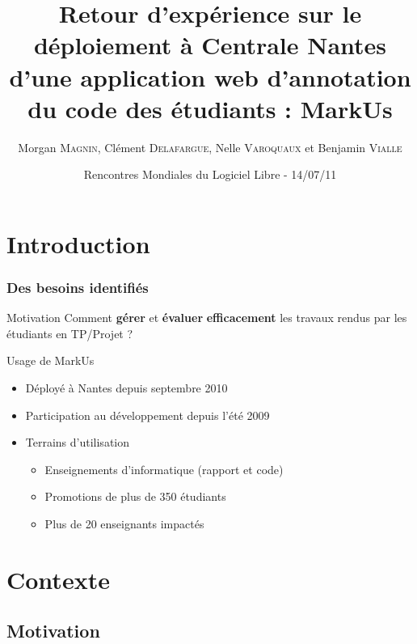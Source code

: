 \documentclass[hyperref,french,usenames,xcolor=dvipsnames]{beamer}
\title[REX MarkUs]%
{Retour d’expérience sur le déploiement à Centrale Nantes d’une application web d’annotation du code des étudiants : MarkUs}
\author[M. \textsc{Magnin}, G. \textsc{Moreau}, N. \textsc{Varoquaux}, B. \textsc{Vialle}]%
{Morgan \textsc{Magnin}, Clément \textsc{Delafargue}, Nelle \textsc{Varoquaux} et Benjamin \textsc{Vialle}
}
\institute[ECN]{
\structure{
École Centrale de Nantes}
}
\date[14/07/2011]{Rencontres Mondiales du Logiciel Libre - 14/07/11}
\begin{document}
\frame{\titlepage}


\section{Introduction}

\frame
{
  \frametitle{Des besoins identifiés}

\begin{alertblock}{Motivation}
Comment \textbf{gérer} et \textbf{évaluer} \textbf{efficacement} les travaux rendus par les étudiants en TP/Projet ?
\end{alertblock}

\begin{block}{Usage de MarkUs}
\begin{itemize}
\item Déployé à Nantes depuis septembre 2010
\item Participation au développement depuis l'été 2009
\item Terrains d'utilisation
\begin{itemize}
\item Enseignements d'informatique (rapport et code)
\item Promotions de plus de 350 étudiants
\item Plus de 20 enseignants impactés
\end{itemize}
\end{itemize}
\end{block}
}

\section{Contexte}

\subsection*{Motivation}
\end{document}

